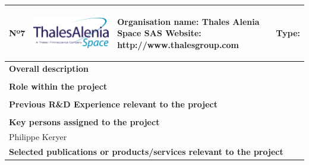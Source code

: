 \begin{longtable}[H]{|p{0.7cm}|p{4cm}|p{7cm}|p{1.3cm}|}
	\hline
	\begin{center} Nº7 \end{center} & \begin{center} \includegraphics[scale=0.25]{./logos/Thales_Alenia_Space_Belgium_logo} \end{center} & \begin{center} \textbf{Organisation name:} Thales Alenia Space SAS \newline \textbf{Website:} http://www.thalesgroup.com \end{center} & \begin{center} Type: \end{center} \\ \hline
	
	\multicolumn{4}{|p{13cm}|}{\textbf{Overall description}}  \\ \hline
	
	\multicolumn{4}{|p{13cm}|}{}  \\ \hline
	
	\multicolumn{4}{|p{13cm}|}{\textbf{Role within the project}}   \\ \hline
	
	\multicolumn{4}{|p{13cm}|}{}  \\ \hline
	
	\multicolumn{4}{|p{13cm}|}{\textbf{Previous R\&D Experience relevant to the project}}  \\ \hline
	
	\multicolumn{4}{|p{13cm}|}{}  \\ \hline
	
	\multicolumn{4}{|p{13cm}|}{\textbf{Key persons assigned to the project}}   \\ \hline
	
	\multicolumn{4}{|p{13cm}|}{Philippe Keryer}  \\ \hline
	
	\multicolumn{4}{|p{13cm}|}{\textbf{Selected publications or products/services relevant to the project}}  \\ \hline
	

\end{longtable}
